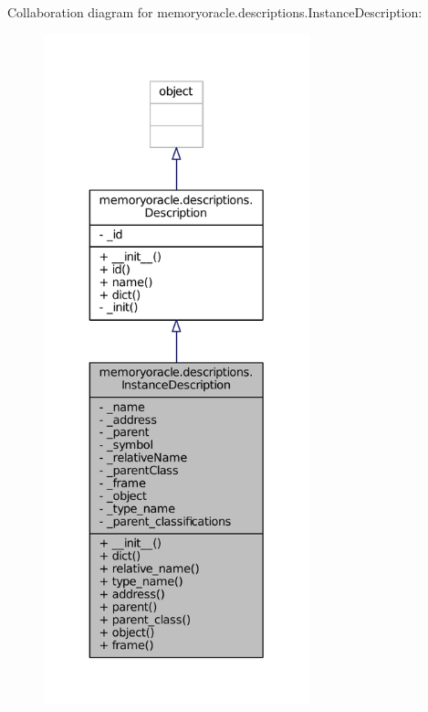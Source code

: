Collaboration diagram for memoryoracle.\+descriptions.\+Instance\+Description\+:\nopagebreak
\begin{figure}[H]
\begin{center}
\leavevmode
\includegraphics[height=550pt]{classmemoryoracle_1_1descriptions_1_1InstanceDescription__coll__graph}
\end{center}
\end{figure}
